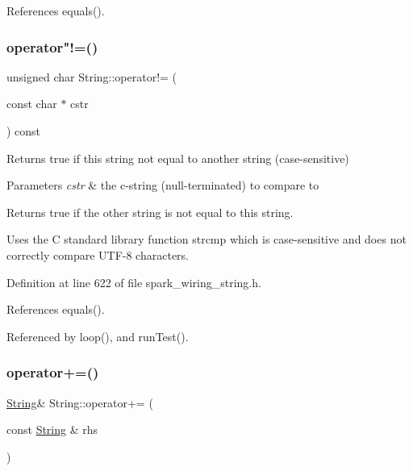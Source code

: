 References equals().

\mbox{\label{class_string_aa3bec091af9c137939b348138ae06e93}} 
\subsubsection{\texorpdfstring{operator"!=()}{operator!=()}\hspace{0.1cm}{\footnotesize\ttfamily [2/2]}}
{\footnotesize\ttfamily unsigned char String\+::operator!= (\begin{DoxyParamCaption}\item[{const char $\ast$}]{cstr }\end{DoxyParamCaption}) const\hspace{0.3cm}{\ttfamily [inline]}}



Returns true if this string not equal to another string (case-\/sensitive) 


\begin{DoxyParams}{Parameters}
{\em cstr} & the c-\/string (null-\/terminated) to compare to\\
\hline
\end{DoxyParams}
\begin{DoxyReturn}{Returns}
true if the other string is not equal to this string.
\end{DoxyReturn}
Uses the C standard library function strcmp which is case-\/sensitive and does not correctly compare U\+T\+F-\/8 characters. 

Definition at line 622 of file spark\+\_\+wiring\+\_\+string.\+h.



References equals().



Referenced by loop(), and run\+Test().

\mbox{\label{class_string_a5a3f29c49cc46fb598fc41767a83dabc}} 
\subsubsection{\texorpdfstring{operator+=()}{operator+=()}\hspace{0.1cm}{\footnotesize\ttfamily [1/8]}}
{\footnotesize\ttfamily \hyperlink{class_string}{String}\& String\+::operator+= (\begin{DoxyParamCaption}\item[{const \hyperlink{class_string}{String} \&}]{rhs }\end{DoxyParamCaption})\hspace{0.3cm}{\ttfamily [inline]}}




